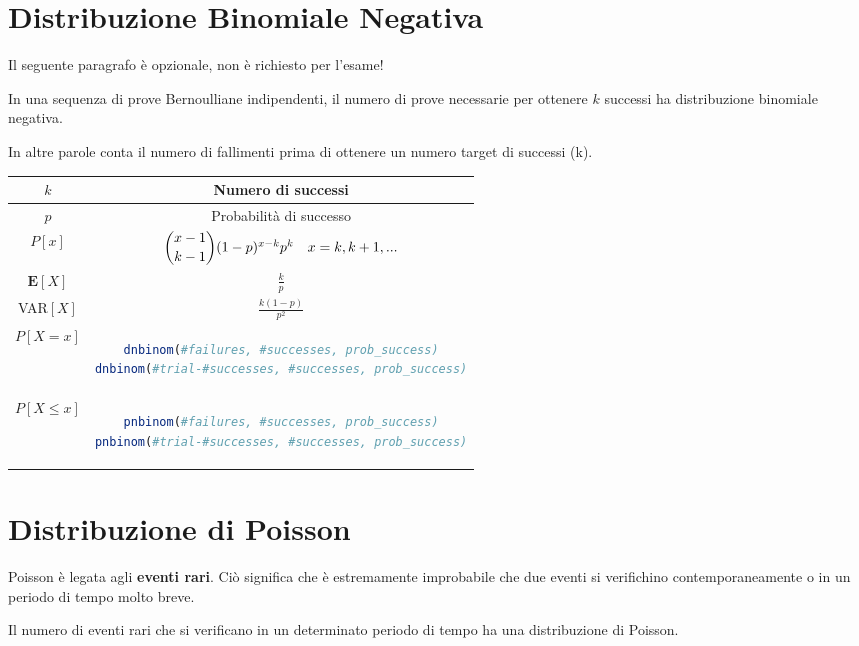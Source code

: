 \newpage
\section{Distribuzione Binomiale Negativa}
\begin{tcolorbox}[title=NOTA]
Il seguente paragrafo è opzionale, non è richiesto per l'esame!
\end{tcolorbox}
\begin{tcolorbox}
In una sequenza di prove Bernoulliane indipendenti, il numero di prove necessarie per ottenere \(k\) successi ha distribuzione binomiale negativa.

In altre parole conta il numero di fallimenti prima di ottenere un numero target di successi (k).
\end{tcolorbox}
\begingroup
\setlength{\tabcolsep}{10pt} %
\renewcommand{\arraystretch}{1.5} %
\begin{center}
\begin{tabular}{ |c|c| } 
\hline
\(k\) & Numero di successi \\ \hline
\(p\) & Probabilità di successo \\ \hline
\(P[x]\) & $\dbinom{x - 1}{k - 1}(1 - p)^{x - k}p^k \quad x = k, k+1,...$\\ \hline
\(\mathbf{E}[X]\) & \(\frac{k}{p}\) \\ \hline
VAR\([X]\) & \(\frac{k(1 - p)}{p^2}\) \\ \hline\hline
\(P[X = x]\) & \begin{lstlisting}[language=R]
dnbinom(#failures, #successes, prob_success)
dnbinom(#trial-#successes, #successes, prob_success)
\end{lstlisting} \\ \hline
\(P[X \leq x]\) & \begin{lstlisting}[language=R]
pnbinom(#failures, #successes, prob_success)
pnbinom(#trial-#successes, #successes, prob_success)
\end{lstlisting} \\ \hline
\end{tabular}
\end{center}
\endgroup

\newpage
\section{Distribuzione di Poisson}
\begin{tcolorbox}
    Poisson è legata agli \textbf{eventi rari}. Ciò significa che è estremamente improbabile che due eventi si verifichino contemporaneamente o in un periodo di tempo molto breve.

    Il numero di eventi rari che si verificano in un determinato periodo di tempo ha una distribuzione di Poisson.
\end{tcolorbox}

